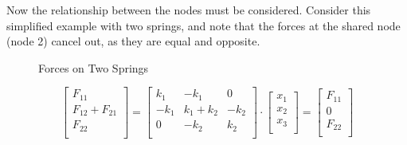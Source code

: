 \documentclass[8pt]{article}
\begin{document}
Now the relationship between the nodes must be considered. Consider this simplified example with two springs, and note that the forces at the shared node (node 2) cancel out, as they are equal and opposite.
\begin{figure}[h!]
    \centering
    \caption{Forces on Two Springs}
\end{figure}
\[
\begin{bmatrix}
    F_{11} \\
    F_{12} + F_{21} \\
    F_{22} \\
\end{bmatrix}
=
\begin{bmatrix}
    k_1 & -k_1 & 0 \\
    -k_1 & k_1 + k_2 & -k_2 \\
    0 & -k_2 & k_2 \\
\end{bmatrix}
\cdot
\begin{bmatrix}
    x_1 \\
    x_2 \\
    x_3 \\
\end{bmatrix}
=
\begin{bmatrix}
    F_{11} \\
    0 \\
    F_{22} \\
\end{bmatrix}
\]
\end{document}
